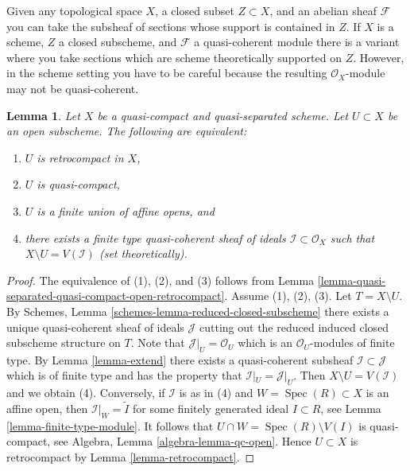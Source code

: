 \documentclass{stacks-project}
\theoremstyle{plain}
\newtheorem{lemma}[subsection]{Lemma}
\theoremstyle{definition}
\theoremstyle{remark}
\numberwithin{equation}{subsection}
\def\Spec{\mathop{\mathrm{Spec}}}
\begin{document}
\noindent
Given any topological space $X$, a closed subset $Z \subset X$, and an
abelian sheaf $\mathcal{F}$ you can take the subsheaf of sections whose
support is contained in $Z$. If $X$ is a scheme, $Z$ a closed
subscheme, and $\mathcal{F}$ a quasi-coherent module there is a variant
where you take sections which are scheme theoretically supported
on $Z$. However, in the scheme setting you have to be careful because
the resulting $\mathcal{O}_X$-module may not be quasi-coherent.

\begin{lemma}
\label{lemma-quasi-coherent-finite-type-ideals}
Let $X$ be a quasi-compact and quasi-separated scheme.
Let $U \subset X$ be an open subscheme. The following are equivalent:
\begin{enumerate}
\item $U$ is retrocompact in $X$,
\item $U$ is quasi-compact,
\item $U$ is a finite union of affine opens, and
\item there exists a finite type quasi-coherent sheaf of ideals
$\mathcal{I} \subset \mathcal{O}_X$ such that $X \setminus U = V(\mathcal{I})$
(set theoretically).
\end{enumerate}
\end{lemma}

\begin{proof}
The equivalence of (1), (2), and (3) follows from
Lemma \ref{lemma-quasi-separated-quasi-compact-open-retrocompact}.
Assume (1), (2), (3). Let $T = X \setminus U$. By
Schemes, Lemma \ref{schemes-lemma-reduced-closed-subscheme} there exists
a unique quasi-coherent sheaf of ideals $\mathcal{J}$ cutting
out the reduced induced closed subscheme structure on $T$.
Note that $\mathcal{J}|_U = \mathcal{O}_U$ which is an
$\mathcal{O}_U$-modules of finite type.
By Lemma \ref{lemma-extend} there exists a quasi-coherent subsheaf
$\mathcal{I} \subset \mathcal{J}$ which is of finite type
and has the property that $\mathcal{I}|_U = \mathcal{J}|_U$.
Then $X \setminus U = V(\mathcal{I})$ and we obtain (4). Conversely,
if $\mathcal{I}$ is as in (4) and $W = \Spec(R) \subset X$ is an affine
open, then $\mathcal{I}|_W = \widetilde{I}$ for some finitely generated
ideal $I \subset R$, see Lemma \ref{lemma-finite-type-module}.
It follows that $U \cap W = \Spec(R) \setminus V(I)$ is quasi-compact,
see Algebra, Lemma \ref{algebra-lemma-qc-open}. Hence $U \subset X$
is retrocompact by Lemma \ref{lemma-retrocompact}.
\end{proof}
\end{document}
